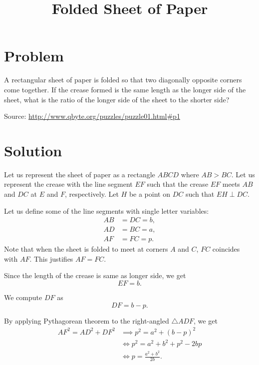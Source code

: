 \documentclass{article}
\title{Folded Sheet of Paper}
\date{}
\begin{document}
\maketitle

\section*{Problem}
A rectangular sheet of paper is folded so that two diagonally opposite
corners come together. If the crease formed is the same length as the
longer side of the sheet, what is the ratio of the longer side of the
sheet to the shorter side?

Source: \url{http://www.qbyte.org/puzzles/puzzle01.html#p1}

\section*{Solution}
Let us represent the sheet of paper as a rectangle \( ABCD \) where
\( AB > BC \). Let us represent the crease with the line segment
\( EF \) such that the crease \( EF \) meets \( AB \) and \( DC \) at
\( E \) and \( F \), respectively. Let \( H \) be a point on \( DC \)
such that \( EH \perp DC \).



Let us define some of the line segments with single letter variables:
\begin{align*}
AB & = DC = b, \\
AD & = BC = a, \\
AF & = FC = p.
\end{align*}
Note that when the sheet is folded to meet at corners \( A \) and
\( C \), \( FC \) coincides with \( AF \). This justifies \( AF = FC \).

Since the length of the crease is same as longer side, we get
\[
EF = b.
\]

We compute \( DF \) as
\begin{equation}
\label{df}
DF = b - p.
\end{equation}

By applying Pythagorean theorem to the right-angled \( \triangle ADF \),
we get
\begin{align*}
AF^2 = AD^2 + DF^2
& \implies p^2  = a^2 + (b - p)^2 \\
& \iff     p^2  = a^2 + b^2 + p^2 - 2bp \\
& \iff     p    = \frac{a^2 + b^2}{2b}.
\end{align*}
\end{document}
